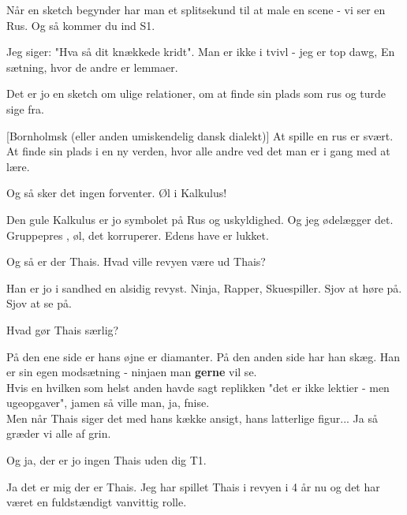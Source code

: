 \documentclass[a4paper,11pt]{article}
\begin{document}
\begin{sketch}
 Når en sketch begynder har man et splitsekund til at male en scene - vi ser en Rus. Og så kommer du ind S1.

 Jeg siger: "Hva så dit knækkede kridt". Man er ikke i tvivl - jeg er top dawg, En sætning, hvor de andre er lemmaer.

 Det er jo en sketch om ulige relationer, om at finde sin plads som rus og turde sige fra.

[Bornholmsk (eller anden umiskendelig dansk dialekt)] At spille en rus er svært. At finde sin plads i en ny verden, hvor alle andre ved det man er i gang med at lære.

 Og så sker det ingen forventer. Øl i Kalkulus!

 Den gule Kalkulus er jo symbolet på Rus og uskyldighed. Og jeg ødelægger det. Gruppepres , øl, det korruperer. Edens have er lukket.

 Og så er der Thais.
 Hvad ville revyen være ud Thais?

 Han er jo i sandhed en alsidig revyst. Ninja, Rapper, Skuespiller. Sjov at høre på. Sjov at se på.





 Hvad gør Thais særlig?

 På den ene side er hans øjne er diamanter. På den anden side har han skæg. Han er sin egen modsætning - ninjaen man \textbf{gerne} vil se.\\
Hvis en hvilken som helst anden havde sagt replikken "det er ikke lektier - men ugeopgaver", jamen så ville man, ja, fnise.\\
 Men når Thais siger det med hans kække ansigt, hans latterlige figur... Ja så græder vi alle af grin.

 Og ja, der er jo ingen Thais uden dig T1.

 Ja det er mig der er Thais. Jeg har spillet Thais i revyen i 4 år nu og det har været en fuldstændigt vanvittig rolle.


\end{sketch}
\end{document}
